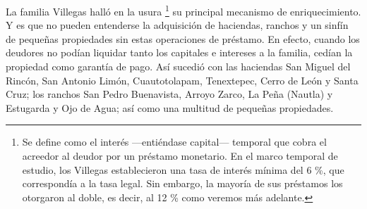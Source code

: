 \documentclass[14pt,twoside,final]{extbook} %
\let\oldfootnote\footnote
\renewcommand\footnote[1]{%
\oldfootnote{\hspace{1mm}#1}}
\begin{document}
La familia Villegas halló en la usura\footnote{Se define como el interés ---entiéndase capital--- temporal que cobra el acreedor al deudor por un préstamo monetario. En el marco temporal de estudio, los Villegas\index[nombres]{Villegas!familia} establecieron una tasa de interés mínima del 6 \%, que correspondía a la tasa legal. Sin embargo, la mayoría de sus préstamos los otorgaron al doble, es decir, al 12 \% como veremos más adelante.} su principal mecanismo de enriquecimiento. Y es que no pueden entenderse la adquisición de haciendas, ranchos y un sinfín de pequeñas propiedades sin estas operaciones de préstamo. En efecto, cuando los deudores no podían liquidar tanto los capitales e intereses a la familia, cedían la propiedad como garantía de pago. Así sucedió con las haciendas San Miguel del Rincón, San Antonio Limón, Cuautotolapam, Tenextepec, Cerro de León y Santa Cruz; los ranchos San Pedro Buenavista, Arroyo Zarco, La Peña (Nautla) y Estugarda y Ojo de Agua; así como una multitud de pequeñas propiedades.
\end{document}
